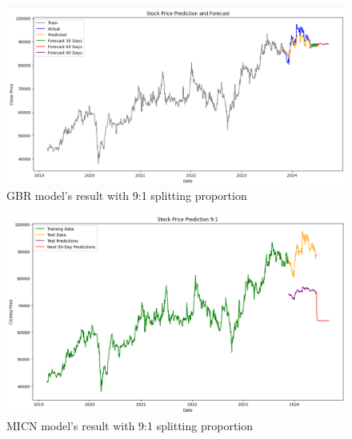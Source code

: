 \documentclass{ieeeojies}
\begin{document}
\begin{figure}[H]
  \centering
  \begin{minipage}{0.8\linewidth}
    \centering
    \includegraphics[width=\linewidth]{bibliography/VCB-GBR-9-1.png}
    \caption{GBR model's result with 9:1 splitting proportion}
    \label{fig12}
  \end{minipage}
\end{figure}
\begin{figure}[H]
  \centering
  \begin{minipage}{0.8\linewidth}
    \centering
    \includegraphics[width=\linewidth]{bibliography/VCB-MICN-9-1.png}
    \caption{MICN model's result with 9:1 splitting proportion}
    \label{fig13}
  \end{minipage}
\end{figure}
\end{document}
